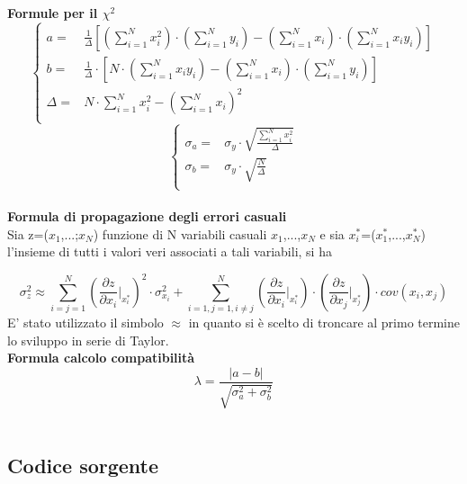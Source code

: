 \documentclass[a4paper,11pt,oneside]{article}
\begin{document}
\textbf{Formule per il ${\chi}^2$}
\begin{equation*}
        \begin{cases}
    a=&\frac{1}{\Delta}[(\sum\limits_{i=1}^{N}{x_{i}^{2}})\cdot(\sum\limits_{i=1}^{N}{y_{i}})-(\sum\limits_{i=1}^{N}{x_{i}})\cdot(\sum\limits_{i=1}^{N}{x_{i}y_{i}})] \\ 
    b=&\frac{1}{\Delta }\cdot \left [N\cdot \left ( \sum\limits_{i=1}^{N}x_i y_i \right )-\left ( \sum\limits_{i=1}^{N}x_i \right )\cdot \left ( \sum\limits_{i=1}^{N}y_i \right )  \right ]\\
    \Delta=& N\cdot \sum\limits_{i=1}^{N} x_i^{2} - \left ( \sum\limits_{i=1}^{N}x_i \right )^{2}\\
    \end{cases}
\end{equation*}
\begin{equation*}
    \begin{cases}
    \sigma_{a}=&\sigma_{y}\cdot\sqrt{\frac{\sum_{i=1}^{N}{x_{i}^{2}}}{\Delta}} \\
    \sigma_{b}=&\sigma_y\cdot \sqrt{\frac{N}{\Delta }}\\
    \end{cases}
    \label{equation:err_chi_quadro}
\end{equation*}
\\
\textbf{Formula di propagazione degli errori casuali}\\

Sia z=($x_1$,...;$x_N$) funzione di N variabili casuali $x_1$,...,$x_N$ e sia ${x_i^\ast}$=($x_1^\ast$,...,$x_N^{\ast}$) l'insieme di tutti i valori veri associati a tali variabili, si ha 

\begin{equation*}
    \sigma_z^{2}\approx  \sum_{i=j=1}^{N}\left ( \frac{\partial z}{\partial x_i}\Big|_{x_i^{\ast}} \right )^{2}\cdot\sigma_{x_i}^{2} +\sum_{i=1,j=1,i\neq j}^{N}\left (\frac{\partial z }{\partial x_i}\Big|_{x_i^{\ast}} \right ) \cdot \left ( \frac{\partial z}{\partial x_j} \Big|_{x_j^{\ast}} \right )\cdot cov(x_i,x_j)\label{eq:prop_errori}
\end{equation*}
E' stato utilizzato il simbolo $\approx$ in quanto si è scelto di troncare al primo termine lo sviluppo in serie di Taylor.\\


\textbf{Formula calcolo compatibilità}\\
\begin{equation*}
    \lambda=\frac{\left|a-b\right|}{\sqrt{\sigma^{2}_{a}+\sigma^{2}_{b}}}
\end{equation*}\\

\subsection{Codice sorgente}
\end{document}
